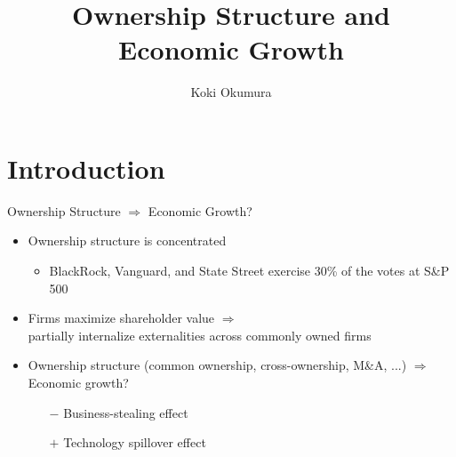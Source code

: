 \documentclass[
  10pt,
  aspectratio=169,   %
]{beamer}
\title{Ownership Structure and Economic Growth}
\author{Koki Okumura}
\institute{UCLA}
\date{}
\theoremstyle{plain}
\begin{document}
\begin{frame}
  \titlepage
\end{frame}

\section{Introduction}

\begin{frame}{Ownership Structure $\Longrightarrow$ Economic Growth?}
  \label{intro}
  \begin{itemize}
    \item Ownership structure is concentrated \hfill \hyperlink{share}{}
          \begin{itemize}
            \item BlackRock, Vanguard, and State Street exercise 30\% of the votes at S\&P 500
          \end{itemize}
          \medskip{} \pause
    \item Firms maximize shareholder value $\Longrightarrow$ \\
          partially internalize externalities across commonly owned firms
          \medskip{} \pause
    \item Ownership structure (common ownership, cross-ownership, M\&A, ...) $\Longrightarrow$ Economic growth?
          \begin{itemize}
            \item[$-$] Business-stealing effect
            \item[$+$] Technology spillover effect
          \end{itemize}
  \end{itemize}
\end{frame}
\end{document}
